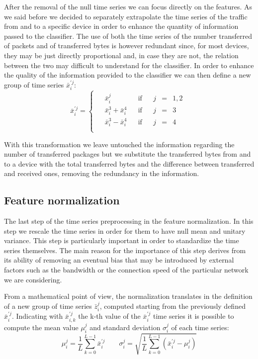After the removal of the null time series we can focus directly on the features. As we said before we decided to separately extrapolate the time series of the traffic from and to a specific device in order to enhance the quantity of information passed to the classifier. The use of both the time series of the number transferred of packets and of transferred bytes is however redundant since, for most devices, they may be just directly proportional and, in case they are not, the relation between the two may difficult to understand for the classifier. In order to enhance the quality of the information provided to the classifier we can then define a new group of time series $\bar{x}^{\prime j}_i$:
\begin{equation}
    \bar{x}^{\prime j}_i = 
    \begin{cases}
    \begin{aligned}
    & \bar{x}_i^j               &&\text{if}&& j&=&1,2 \\
    & \bar{x}_i^3 + \bar{x}_i^4 &&\text{if}&& j&=&3 \\
    & \bar{x}_i^3 - \bar{x}_i^4 &&\text{if}&& j&=&4 \\
    \end{aligned}
    \end{cases}
\end{equation}

With this transformation we leave untouched the information regarding the number of transferred packages but we substitute the transferred bytes from and to a device with the total transferred bytes and the difference between transferred and received ones, removing the redundancy in the information.

\subsection{Feature normalization}

The last step of the time series preprocessing in the feature normalization. In this step we rescale the time series in order for them to have null mean and unitary variance. This step is particularly important in order to standardize the time series themselves. The main reason for the importance of this step derives from its ability of removing an eventual bias that may be introduced by external factors such as the bandwidth or the connection speed of the particular network we are considering.

From a mathematical point of view, the normalization translates in the definition of a new group of time series $\bar{z}^{j}_i$, computed starting from the previously defined $\bar{x}^{\prime j}_i$. Indicating with $\bar{x}^{\prime j}_{i,k}$ the k-th value of the $\bar{x}^{\prime j}_i$ time series it is possible to compute the mean value $\mu_i^j$ and standard deviation $\sigma_i^j$ of each time series:
\begin{equation}
\mu_i^j = \frac{1}{L}\sum_{k=0}^{L-1} \bar{x}^{\prime j}_i\qquad
    \sigma_i^j = \sqrt{\frac{1}{L}\sum_{k=0}^{L-1}
                \left(\bar{x}^{\prime j}_i-\mu_i^j\right)}
\end{equation}



